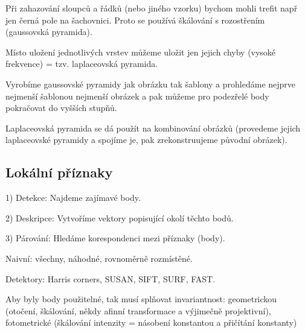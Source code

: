\documentclass[12pt]{article}					%
\begin{document}
\begin{definice}
	Při zahazování sloupců a řádků (nebo jiného vzorku) bychom mohli trefit např jen černá pole na šachovnici. Proto se používá škálování s rozostřením (gaussovská pyramida).

	Místo uložení jednotlivých vrstev můžeme uložit jen jejich chyby (vysoké frekvence) = tzv. laplaceovská pyramida.
\end{definice}

\begin{definice}
	Vyrobíme gaussovské pyramidy jak obrázku tak šablony a prohledáme nejprve nejmenší šablonou nejmenší obrázek a pak můžeme pro podezřelé body pokračovat do vyšších stupňů.
\end{definice}

\begin{poznamka}
	Laplaceovská pyramida se dá použít na kombinování obrázků (provedeme jejich laplaceovské pyramidy a spojíme je, pak zrekonstruujeme původní obrázek).
\end{poznamka}


\subsection{Lokální příznaky}
\begin{definice}
	1) Detekce: Najdeme zajímavé body.

	2) Deskripce: Vytvoříme vektory popisující okolí těchto bodů.

	3) Párování: Hledáme korespondenci mezi příznaky (body).
\end{definice}

\begin{definice}[Detekce]
	Naivní: všechny, náhodné, rovnoměrně rozmístěné.

	Detektory: Harris corners, SUSAN, SIFT, SURF, FAST.
\end{definice}

\begin{poznamka}
	Aby byly body použitelné, tak musí splňovat invariantnost: geometrickou (otočení, škálování, někdy afinní transformace a výjimečně projektivní), fotometrické (škálování intenzity = násobení konstantou a přičítání konstanty)
\end{poznamka}
\end{document}
